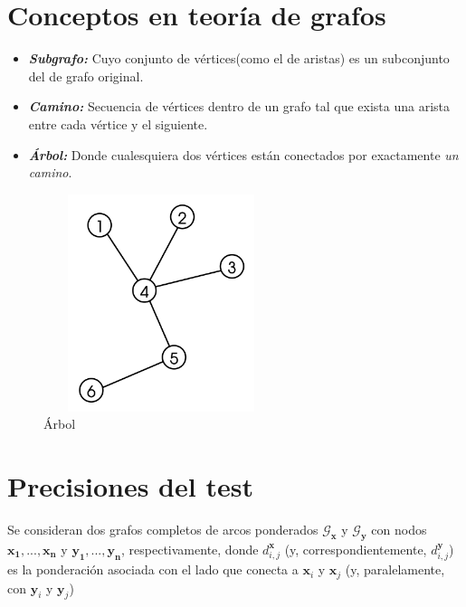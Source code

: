 \documentclass[]{book}
\providecommand{\tightlist}{%
  \setlength{\itemsep}{0pt}\setlength{\parskip}{0pt}}
\begin{document}
\section{Conceptos en teoría de
grafos}\label{conceptos-en-teoria-de-grafos}

\begin{itemize}
\tightlist
\item
  \textbf{\emph{Subgrafo:}} Cuyo conjunto de vértices(como el de
  aristas) es un subconjunto del de grafo original.
\item
  \textbf{\emph{Camino:}} Secuencia de vértices dentro de un grafo tal
  que exista una arista entre cada vértice y el siguiente.
\item
  \textbf{\emph{Árbol:}} Donde cualesquiera dos vértices están
  conectados por exactamente \emph{un camino}.
\end{itemize}

\begin{figure}

{\centering \includegraphics[width=260,height=240]{Tree_graph} 

}

\caption{Árbol}\label{fig:unnamed-chunk-2}
\end{figure}

\section{Precisiones del test}\label{precisiones-del-test}

Se consideran dos grafos completos de arcos ponderados
\(\mathcal{G}_{\mathbf{x}}\) y \(\mathcal{G}_{\mathbf{y}}\) con nodos
\(\mathbf{x_1,...,x_n}\) y \(\mathbf{y_1,..., y_n}\), respectivamente,
donde \(d_{i,j}^{\mathbf{x}}\) (y, correspondientemente,
\(d_{i,j}^{\mathbf{y}}\)) es la ponderación asociada con el lado que
conecta a \(\mathbf{x}_i\) y \(\mathbf{x}_j\) (y, paralelamente, con
\(\mathbf{y}_i\) y \(\mathbf{y}_j\)) \citep{friedman1983graph}
\end{document}
